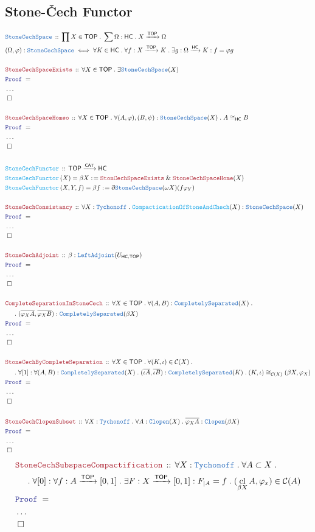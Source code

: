 \documentclass[12pt]{scrartcl}
\newcommand{\TYPE}[1]{\textcolor{NavyBlue}{\mathtt{#1}}}
\newcommand{\FUNC}[1]{\textcolor{Cerulean}{\mathtt{#1}}}
\newcommand{\LOGIC}[1]{\textcolor{Blue}{\mathtt{#1}}}
\newcommand{\THM}[1]{\textcolor{Maroon}{\mathtt{#1}}}
\renewcommand{\.}{\; . \;}
\newcommand{\de}{: \kern 0.1pc =}
\newcommand{\Act}[1]{\left( #1 \right)}
\newcommand{\Theorem}[2]{& \THM{#1} \, :: \, #2 \\ & \Proof = \\ }
\newcommand{\DeclareType}[2]{& \TYPE{#1} \, :: \, #2 \\}
\newcommand{\DefineType}[3]{& #1 : \TYPE{#2} \iff #3 \\}
\newcommand{\DeclareFunc}[2]{& \FUNC{#1} \, :: \, #2 \\}
\newcommand{\DefineNamedFunc}[4]{&  \FUNC{#1}\Act{#2} = #3 \de #4 \\}
\newcommand{\NewLine}{\\ & \kern 1pc}
\newcommand{\Page}[1]{ \begin{align*} #1 \end{align*}   }
\newcommand{ \bd }{ \ByDef }
\newcommand{\NoProof}{ & \ldots \\ \EndProof}
\renewcommand{\And}{\; \& \;}
\newcommand{\Arrow}{\xrightarrow}
\newcommand{\QED}{\; \square}
\newcommand{\EndProof}{& \QED \\}
\newcommand{\ByDef}{\eth}
\newcommand{\Proof}{\LOGIC{Proof} \; }
\newcommand{\C}{\mathcal{C}}
\newcommand{\CAT}{\mathsf{CAT}}
\DeclareMathOperator*{\cl}{cl}
\newcommand{\TOP}{\mathsf{TOP}}
\newcommand{\HC}{\mathsf{HC}}
\begin{document}
\subsection{Stone-\v{C}ech Functor}
\Page{
	\DeclareType{StoneCechSpace}{\prod X \in \TOP \. \sum \Omega : \HC \.  X \Arrow{\TOP} \Omega }
	\DefineType{(\Omega,\varphi)}{StoneCechSpace}
	{
		 \forall K \in \HC \. \forall f : X \Arrow{\TOP} K \. 
		 \exists g : \Omega \Arrow{\HC} K :  f = \varphi g  
	}
	\\
	\Theorem{StoneCechSpaceExists}
	{
		\forall X \in \TOP \. \exists \TYPE{StoneCechSpace}(X)
	}
	\NoProof
	\\
	\Theorem{StoneCechSpaceHomeo}
	{
		\forall X \in \TOP \. \forall (A,\varphi),(B,\psi) : \TYPE{StoneCechSpace}(X)
		\. A \cong_{\HC} B 
	}
	\NoProof
	\\
	\DeclareFunc{StoneCechFunctor}{\TOP \Arrow{\CAT} \HC}
	\DefineNamedFunc{StoneCechFunctor}{X}{\beta X}{\THM{StonCechSpaceExists}
		\And \THM{StoneCechSpaceHome}(X)}
	\DefineNamedFunc{StoneCechFunctor}{X,Y,f}{\beta f}{\bd \TYPE{StoneCechSpace}(\omega X)(f\varphi_Y)}
	\\
	\Theorem{StoneCechConsistancy}
	{
		\forall X : \TYPE{Tychonoff} \. \FUNC{CompacticationOfStoneAndChech}(X) : \TYPE{StoneCechSpace}(X)
	}
	\NoProof
	\\
	\Theorem{StoneCechAdjoint}{\beta : \TYPE{LeftAdjoint}(U_{\HC,\TOP})}
	\NoProof
	\\
	\Theorem{CompleteSeparationInStoneCech}
	{
		\forall X \in \TOP \. 
		\forall (A,B)  :  \TYPE{CompletelySeparated}(X) \. \NewLine \.
		(\overline{\varphi_X A}, \overline{\varphi_X B})  : \TYPE{CompletelySeparated}(\beta X)
	}
	\NoProof
	\\
	\Theorem{StoneCechByCompleteSeparation}
	{
		\forall X \in \TOP \.
		\forall (K,\iota) \in \C(X) \.  \NewLine \.
		\forall [1] : \forall (A,B) : \TYPE{CompletelySeparated}(X) \.   
			(\overline{\iota A}, \overline{\iota B} ) : \TYPE{CompletelySeparated}(K)	 \.
		(K,\iota) \cong_{\C(X)} (\beta X,\varphi_X)	
	}
	\NoProof
	\\
	\Theorem{StoneCechClopenSubset}
	{
		\forall X : \TYPE{Tychonoff} \.
		\forall A  : \TYPE{Clopen}(X) \.
		\overline{\varphi_X A} : \TYPE{Clopen}(\beta X)		
	} 
	\NoProof
}\Page{
	\Theorem{ StoneCechSubspaceCompactification}
	{
	 	\forall X : \TYPE{Tychonoff} \.
	 	\forall A \subset X \. \NewLine \.
	 	\forall  [0] : \forall f : A \Arrow{\TOP} [0,1] \. \exists F : X \Arrow{\TOP} [0,1] : F_{|A} = f  \.
	 	 (\cl_{\beta X} A,\varphi_x) \in \C(A) 
	}
	\NoProof
	\\
}
\end{document}
